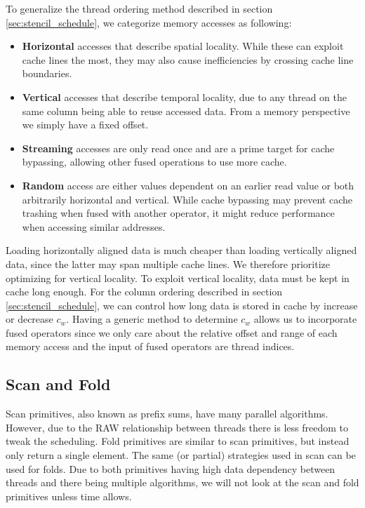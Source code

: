 \documentclass{article}
\begin{document}
To generalize the thread ordering method described in section \ref{sec:stencil_schedule}, we categorize memory accesses as following:
\begin{itemize}
    \item \textbf{Horizontal} accesses that describe spatial locality. 
    While these can exploit cache lines the most, they may also cause inefficiencies by crossing cache line boundaries.
    
    \item \textbf{Vertical} accesses that describe temporal locality, due to any thread on the same column being able to reuse accessed data. From a memory perspective we simply have a fixed offset.
    
    \item \textbf{Streaming} accesses are only read once and are a prime target for cache bypassing, allowing other fused operations to use more cache.
    
    \item \textbf{Random} access are either values dependent on an earlier read value or both arbitrarily horizontal and vertical. While cache bypassing may prevent cache trashing when fused with another operator, it might reduce performance when accessing similar addresses.
\end{itemize}
Loading horizontally aligned data is much cheaper than loading vertically aligned data, since the latter may span multiple cache lines.
We therefore prioritize optimizing for vertical locality.
To exploit vertical locality, data must be kept in cache long enough.
For the column ordering described in section \ref{sec:stencil_schedule}, we can control how long data is stored in cache by increase or decrease $c_w$.
Having a generic method to determine $c_w$ allows us to incorporate fused operators since we only care about the relative offset and range of each memory access and the input of fused operators are thread indices.


\subsection{Scan and Fold}
Scan primitives, also known as prefix sums, have many parallel algorithms.
However, due to the RAW relationship between threads there is less freedom to tweak the scheduling.
Fold primitives are similar to scan primitives, but instead only return a single element.
The same (or partial) strategies used in scan can be used for folds.
Due to both primitives having high data dependency between threads and there being multiple algorithms, we will not look at the scan and fold primitives unless time allows.
\end{document}
